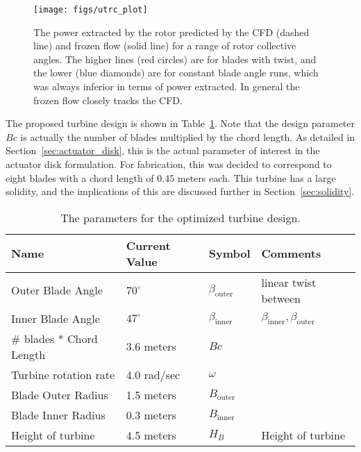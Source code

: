   \begin{figure}[!htb]
   \begin{center}
    \texttt{[image: figs/utrc\_plot]}
    \caption{The power extracted by the rotor predicted by the CFD
    (dashed line) and frozen flow (solid line) for a range of rotor
    collective angles. The higher lines (red circles) are for blades
    with twist, and the lower (blue diamonds) are for constant blade
    angle runs, which was always  inferior in terms of power
    extracted. In general the frozen flow closely tracks the CFD.}
    \label{fig:UTRC_turbine}
   \end{center}
  \end{figure}

The proposed turbine design is shown in Table~\ref{tab:turbine}. Note
that the design parameter $Bc $ is actually the number of blades
multiplied by the chord length. As detailed in
Section~\ref{sec:actuator_disk}, this is the actual parameter of
interest in the actuator disk formulation. For fabrication, this was 
decided to correspond to eight blades with a chord length of 0.45 meters
each. This turbine has a large solidity, and the implications of this
are discussed further in Section~\ref{sec:solidity}. 

\begin{table}[!htb]
\centering
 \caption{The parameters for the optimized turbine design.}
\begin{tabular}{l|l|l|l}
Name                & Current Value    & Symbol           & Comments \\
 \hline
Outer Blade Angle & $70^{\circ}$ & $\beta_{\text{outer}}$  & linear twist between \\
Inner Blade Angle & $47^{\circ}$ & $\beta_\text{inner}$    & 
	     $\beta_\text{inner},\beta_\text{outer}$ \\ 
\# blades * Chord Length & 3.6 meters  & $Bc $ &  \\
Turbine rotation rate & 4.0 rad/sec  & $\omega$         &  \\
Blade Outer Radius  & 1.5 meters   & $B_\text{outer}$ &  \\
Blade Inner Radius  & 0.3 meters   & $B_\text{inner}$ &  \\
Height of turbine   & 4.5 meters   & $H_B$            & Height of turbine \\
\hline
\end{tabular}
 \label{tab:turbine}
\end{table}

